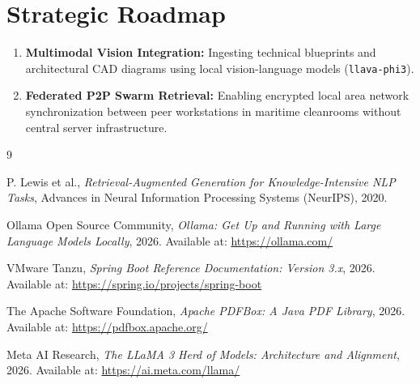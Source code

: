 \documentclass[12pt,a4paper]{report}
\begin{document}
\section{Strategic Roadmap}
\begin{enumerate}[nosep]
    \item \textbf{Multimodal Vision Integration:} Ingesting technical blueprints and architectural CAD diagrams using local vision-language models (\texttt{llava-phi3}).
    \item \textbf{Federated P2P Swarm Retrieval:} Enabling encrypted local area network synchronization between peer workstations in maritime cleanrooms without central server infrastructure.
\end{enumerate}

\cleardoublepage
\begin{thebibliography}{9}

P. Lewis et al., \textit{Retrieval-Augmented Generation for Knowledge-Intensive NLP Tasks}, Advances in Neural Information Processing Systems (NeurIPS), 2020.

Ollama Open Source Community, \textit{Ollama: Get Up and Running with Large Language Models Locally}, 2026. Available at: \url{https://ollama.com/}

VMware Tanzu, \textit{Spring Boot Reference Documentation: Version 3.x}, 2026. Available at: \url{https://spring.io/projects/spring-boot}

The Apache Software Foundation, \textit{Apache PDFBox: A Java PDF Library}, 2026. Available at: \url{https://pdfbox.apache.org/}

Meta AI Research, \textit{The LLaMA 3 Herd of Models: Architecture and Alignment}, 2026. Available at: \url{https://ai.meta.com/llama/}

\end{thebibliography}
\end{document}
